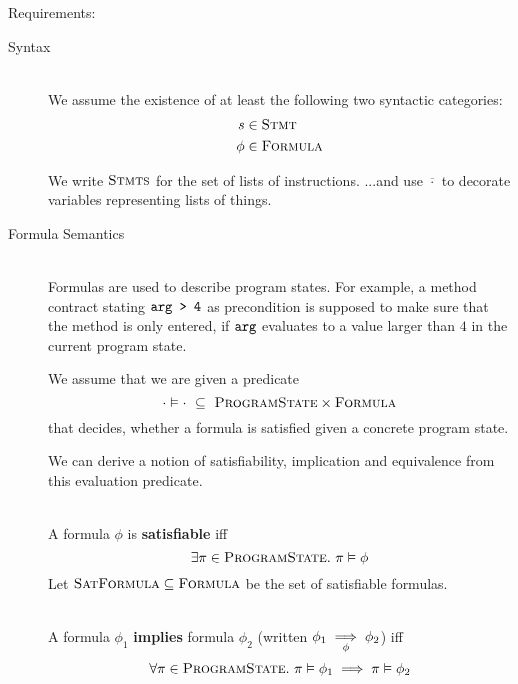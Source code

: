 
Requirements:

\begin{description}
\item[Syntax] ~\\
    We assume the existence of at least the following two syntactic categories:
    \begin{align*}
    	s    & \in \textsc{Stmt}    \\
    	\phi & \in \textsc{Formula}
    \end{align*}
    
    We write $\textsc{Stmts}$ for the set of lists of instructions. %
    ...and use $\overline{\cdot}$ to decorate variables representing lists of things.
    
\item[Formula Semantics]~\\
    Formulas are used to describe program states.
    For example, a method contract stating $\texttt{arg > 4}$ as precondition is supposed to make sure that the method is only entered, if $\texttt{arg}$ evaluates to a value larger than $4$ in the current program state.
    
    We assume that we are given a predicate
    \begin{displaymath}
    \cdot \vDash \cdot ~\subseteq~ \textsc{ProgramState} \times \textsc{Formula}
    \end{displaymath}
    that decides, whether a formula is satisfied given a concrete program state.
    
    
    We can derive a notion of satisfiability, implication and equivalence from this evaluation predicate.
    
    \begin{definition}~\\
        A formula $\phi$ is \textbf{satisfiable} iff
        \begin{displaymath}
        \exists \pi \in \textsc{ProgramState}.~ \pi \vDash \phi
        \end{displaymath}
        Let $\textsc{SatFormula} \subseteq \textsc{Formula}$ be the set of satisfiable formulas.
    \end{definition}
    
    \begin{definition}~\\
        A formula $\phi_1$ \textbf{implies} formula $\phi_2$ (written ${\phi_1} \underset{\phi}{\implies} {\phi_2}$) iff
        \begin{displaymath}
        \forall \pi \in \textsc{ProgramState}.~ \pi \vDash \phi_1 \implies \pi \vDash \phi_2
        \end{displaymath}
    \end{definition}
    

\end{description}
